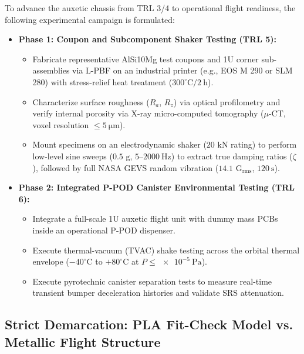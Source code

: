 To advance the auxetic chassis from TRL 3/4 to operational flight readiness, the following experimental campaign is formulated:
\begin{itemize}
\item \textbf{Phase 1: Coupon and Subcomponent Shaker Testing (TRL 5):}
  \begin{itemize}
  \item Fabricate representative AlSi10Mg test coupons and 1U corner sub-assemblies via L-PBF on an industrial printer (e.g., EOS M 290 or SLM 280) with stress-relief heat treatment ($300^\circ\text{C} / \SI{2}{\hour}$).
  \item Characterize surface roughness ($R_a$, $R_z$) via optical profilometry and verify internal porosity via X-ray micro-computed tomography ($\mu\text{-CT}$, voxel resolution $\le \SI{5}{\micro\meter}$).
  \item Mount specimens on an electrodynamic shaker ($20\text{ kN}$ rating) to perform low-level sine sweeps ($0.5\text{ g}$, $5\text{--}\SI{2000}{\hertz}$) to extract true damping ratios ($\zeta$), followed by full NASA GEVS random vibration ($14.1\text{ G}_{\text{rms}}$, $\SI{120}{\second}$).
  \end{itemize}
\item \textbf{Phase 2: Integrated P-POD Canister Environmental Testing (TRL 6):}
  \begin{itemize}
  \item Integrate a full-scale 1U auxetic flight unit with dummy mass PCBs inside an operational P-POD dispenser.
  \item Execute thermal-vacuum (TVAC) shake testing across the orbital thermal envelope ($-40^\circ\text{C}$ to $+80^\circ\text{C}$ at $P \le \SI{e-5}{\pascal}$).
  \item Execute pyrotechnic canister separation tests to measure real-time transient bumper deceleration histories and validate SRS attenuation.
  \end{itemize}
\end{itemize}

\subsection{Strict Demarcation: PLA Fit-Check Model vs. Metallic Flight Structure}

